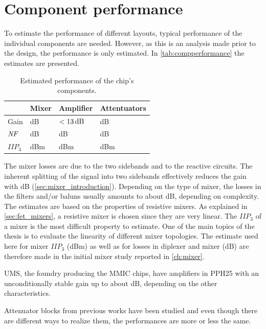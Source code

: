 	\section{Component performance}
		To estimate the performance of different layouts, typical performance of the individual components are needed. However, as this is an analysis made prior to the design, the performance is only estimated. In \autoref{tab:compperformance} the estimates are presented.

		\begin{table}[hbt!]
			\caption[Estimated performance of chip components.]{Estimated performance of the chip's components.}
			\label{tab:compperformance}
			\centering
			\begin{tabular}{ l l l l } \toprule
				& Mixer & Amplifier & Attentuators \\\midrule
				Gain & \unit[-8]{dB} & $\unit[<13]{dB}$ & \unit[-2--12]{dB} \\
				$\emph{NF}$ & \unit[8]{dB} & \unit[1--2]{dB} & \unit[2--12]{dB} \\
				$IIP_3$ & \unit[20--27]{dBm} & \unit[14--22]{dBm} & \unit[30]{dBm} \\\bottomrule
			\end{tabular}
		\end{table}

		The mixer losses are due to the two sidebands and to the reactive circuits. The inherent splitting of the signal into two sidebands effectively reduces the gain with \unit[3]{dB} (\autoref{sec:mixer_introduction}). Depending on the type of mixer, the losses in the filters and/or baluns usually amounts to about \unit[3--7]{dB}, depending on complexity. The estimates are based on the properties of resistive mixers. As explained in \autoref{sec:fet_mixers}, a resistive mixer is chosen since they are very linear. The $IIP_3$ of a mixer is the most difficult property to estimate. One of the main topics of the thesis is to evaluate the linearity of different mixer topologies. The estimate used here for mixer $IIP_3$ (\unit[25]{dBm}) as well as for losses in diplexer and mixer (\unit[8]{dB}) are therefore made in the initial mixer study reported in \autoref{ch:mixer}.

		UMS, the foundry producing the MMIC chips, have amplifiers in PPH25 with an unconditionally stable gain up to about \unit[13]{dB}, depending on the other characteristics.\autocite{pph25manual}

		Attenuator blocks from previous works have been studied and even though there are different ways to realize them, the performances are more or less the same.\autocite{gustavsson07}

